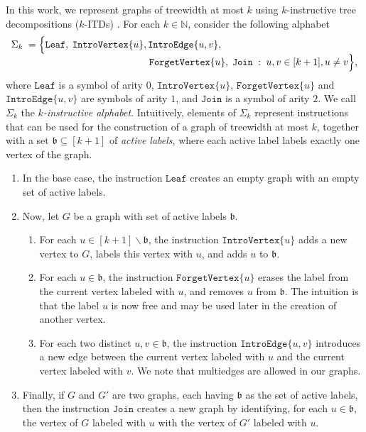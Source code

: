\documentclass[11pt,a4paper]{article}
\newcommand{\treewidthvalue}{k}
\newcommand{\agraph}{G}
\newcommand{\N}{\mathbb{N}}
\newcommand{\abag}{\mathfrak{b}}
\newcommand{\introvertextype}[1]{\mathtt{IntroVertex}\{#1\}}
\newcommand{\introedgetype}[2]{\mathtt{IntroEdge}\{#1,#2\}}
\newcommand{\forgetvertextype}[1]{\mathtt{ForgetVertex}\{#1\}}
\newcommand{\jointype}{\mathtt{Join}}
\newcommand{\leaftype}{\mathtt{Leaf}}
\newcommand{\vertexone}{u}
\newcommand{\vertextwo}{v}
\newcommand{\abstractalphabet}[1]{\Sigma_{#1}}
\begin{document}
In this work, we represent graphs of treewidth at most $\treewidthvalue$ using $\treewidthvalue$-instructive tree decompositions ($k$-ITDs) \cite{de2023width}. For each $\treewidthvalue\in \N$, consider the following alphabet
\begin{equation}
\label{equation:InstructiveAlphabet}
\begin{array}{l}
\abstractalphabet{\treewidthvalue} \; = \Big\{\leaftype,\; \introvertextype{\vertexone}, \introedgetype{\vertexone}{\vertextwo},
\\ \hspace{5.cm}
\forgetvertextype{\vertexone},
  \; \jointype
  \;:\; \vertexone,\vertextwo\in [\treewidthvalue+1], \vertexone\neq \vertextwo \Big\},
\end{array}
\end{equation}
\noindent where $\leaftype$ is a symbol of arity $0$, $\introvertextype{\vertexone}$, $\forgetvertextype{\vertexone}$
and $\introedgetype{\vertexone}{\vertextwo}$ are symbols of arity $1$, and $\jointype$ is a symbol of arity $2$. We call $\abstractalphabet{\treewidthvalue}$ the {\em $k$-instructive alphabet}. Intuitively, elements of $\abstractalphabet{\treewidthvalue}$ represent instructions that can be used for the construction of a graph of treewidth at most $\treewidthvalue$, together with a set $\abag\subseteq [\treewidthvalue+1]$ of {\em active labels}, where each active label labels exactly one vertex of the graph.

\begin{enumerate}
\item In the base case, the instruction $\leaftype$ creates an empty graph with an empty set of active labels.
\item Now, let $\agraph$ be a graph with set of active labels $\abag$.
\begin{enumerate}
\item For each $\vertexone\in [\treewidthvalue+1]\backslash \abag$, the instruction $\introvertextype{\vertexone}$ adds a new vertex
to $G$, labels this vertex with $\vertexone$, and adds $\vertexone$ to $\abag$.
\item For each $\vertexone\in \abag$, the
instruction $\forgetvertextype{\vertexone}$ erases the label from the current vertex labeled with $\vertexone$, and
removes $\vertexone$ from $\abag$. The intuition is that the label $\vertexone$ is now free and may be used later in the
creation of another vertex.
\item For each two distinct $\vertexone,\vertextwo\in \abag$, the instruction $\introedgetype{\vertexone}{\vertextwo}$
introduces a new edge between the current vertex labeled with $\vertexone$ and the current vertex labeled with $\vertextwo$.
We note that multiedges are allowed in our graphs.
\end{enumerate}
\item Finally, if $\agraph$ and $\agraph'$ are two graphs, each having $\abag$ as the set of active labels, then the instruction
$\jointype$ creates a new graph by identifying, for each $\vertexone\in \abag$, the vertex of $\agraph$ labeled
with $\vertexone$ with the vertex of $\agraph'$ labeled with $\vertexone$.
\end{enumerate}
\end{document}
